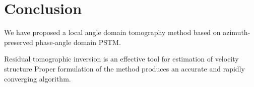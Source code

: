 \section{Conclusion}

We have proposed a local angle domain tomography method based on azimuth-preserved phase-angle domain PSTM. 

Residual tomographic inversion is an effective tool for
estimation of velocity structure Proper formulation of the
method produces an accurate and rapidly converging
algorithm.

